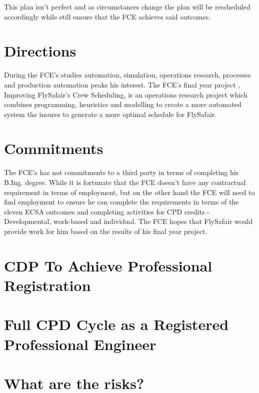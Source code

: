 \documentclass[11pt,a4paper]{article}
\begin{document}
		This plan isn't perfect and as circumstances change the plan will be rescheduled accordingly while still ensure that the FCE achieves said outcomes.
		
	\section{Directions}
		During the FCE's studies automation, simulation, operations research, processes and production automation peaks his interest. 
		The FCE's final year project , Improving FlySafair's Crew Scheduling, is an operations research project which combines programming, heuristics and modelling to create a more automated system the insures to generate a more optimal schedule for FlySafair.
		
	
	\section{Commitments}
		The FCE's has not commitments to a third party in terms of completing his B.Ing. degree.
		While it is fortunate that the FCE doesn't have any contractual requirement in terms of employment, but on the other hand the FCE will need to find employment to ensure he can complete the requirements in terms of the eleven ECSA outcomes and completing activities for CPD credits - Developmental, work-based and individual. The FCE hopes that FlySafair would provide work for him based on the results of his final year project.
	
	
	\section{CDP To Achieve Professional Registration}
		
	
	
	\section{Full CPD Cycle as a Registered Professional Engineer}
	
	\section{What are the risks?}
				
\end{document}
